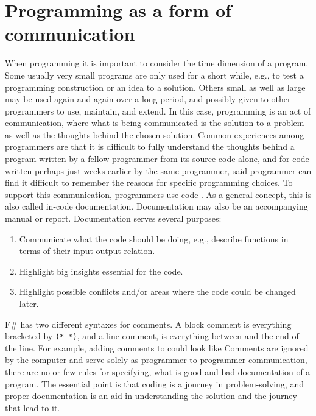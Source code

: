 \documentclass[fsharpNotes.tex]{subfiles}
\begin{document}
\section{Programming as a form of communication}
When programming it is important to consider the time dimension of a program. Some usually very small programs are only used for a short while, e.g., to test a programming construction or an idea to a solution. Others small as well as large may be used again and again over a long period, and possibly given to other programmers to use, maintain, and extend. In this case, programming is an act of communication, where what is being communicated is the solution to a problem as well as the thoughts behind the chosen solution. Common experiences among programmers are that it is difficult to fully understand the thoughts behind a program written by a fellow programmer from its source code alone, and for code written perhaps just weeks earlier by the same programmer, said programmer can find it difficult to remember the reasons for specific programming choices. To support this communication, programmers use code-. As a general concept, this is also called in-code documentation. Documentation may also be an accompanying manual or report. Documentation serves several purposes:
\begin{enumerate}
\item Communicate what the code should be doing, e.g., describe functions in terms of their input-output relation.
\item Highlight big insights essential for the code.
\item Highlight possible conflicts and/or areas where the code could be changed later.
\end{enumerate}
F\# has two different syntaxes for comments. A block comment is everything bracketed by \lstinline{(* *)}, and a line comment, is everything between \lexeme{//} and the end of the line. For example, adding comments to  could look like 
% 
%
Comments are ignored by the computer and serve solely as programmer-to-programmer communication, there are no or few rules for specifying, what is good and bad documentation of a program. The essential point is that coding is a journey in problem-solving, and proper documentation is an aid in understanding the solution and the journey that lead to it.
\end{document}
